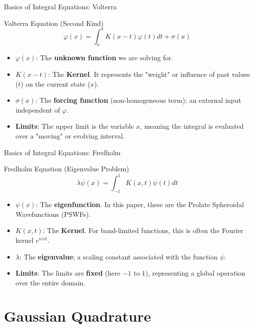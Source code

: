 \documentclass[10pt]{beamer}
\begin{document}
\begin{frame}{Basics of Integral Equations: Volterra}
    \begin{block}{Volterra Equation (Second Kind)}
        \[ \varphi(x) = \int_{a}^{x} K(x-t)\varphi(t)dt + \sigma(x) \]
    \end{block}
    \begin{itemize}
        \item \textbf{$\varphi(x)$}: The \textbf{unknown function} we are solving for.
        \item \textbf{$K(x-t)$}: The \textbf{Kernel}. It represents the "weight" or influence of past values ($t$) on the current state ($x$).
        \item \textbf{$\sigma(x)$}: The \textbf{forcing function} (non-homogeneous term); an external input independent of $\varphi$.
        \item \textbf{Limits}: The upper limit is the variable \textbf{$x$}, meaning the integral is evaluated over a "moving" or evolving interval.
    \end{itemize}
\end{frame}

\begin{frame}{Basics of Integral Equations: Fredholm}
    \begin{block}{Fredholm Equation (Eigenvalue Problem)}
        \[ \lambda \psi(x) = \int_{-1}^{1} K(x,t) \psi(t) dt \]
    \end{block}
    \begin{itemize}
        \item \textbf{$\psi(x)$}: The \textbf{eigenfunction}. In this paper, these are the Prolate Spheroidal Wavefunctions (PSWFs).
        \item \textbf{$K(x,t)$}: The \textbf{Kernel}. For band-limited functions, this is often the Fourier kernel $e^{icxt}$.
        \item \textbf{$\lambda$}: The \textbf{eigenvalue}; a scaling constant associated with the function $\psi$.
        \item \textbf{Limits}: The limits are \textbf{fixed} (here $-1$ to $1$), representing a global operation over the entire domain.
    \end{itemize}
\end{frame}

\section{Gaussian Quadrature}
\end{document}
